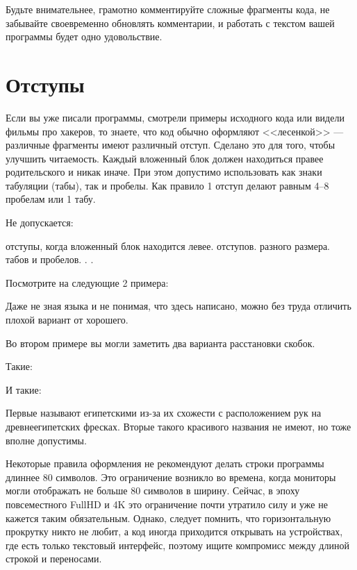 \documentclass[book.tex]{subfiles}
\begin{document}

Будьте внимательнее, грамотно комментируйте сложные фрагменты кода, не забывайте своевременно обновлять комментарии, и работать с текстом вашей программы будет одно удовольствие.

\section*{Отступы}

Если вы уже писали программы, смотрели примеры исходного кода или видели фильмы про хакеров, то знаете, что код обычно оформляют <<лесенкой>> --- различные фрагменты имеют различный отступ. Сделано это для того, чтобы улучшить читаемость. Каждый вложенный блок должен находиться правее родительского и никак иначе. При этом допустимо использовать как знаки табуляции (табы), так и пробелы. Как правило 1 отступ делают равным 4--8 пробелам или 1 табу.

Не допускается:
\begin{itemize}
 отступы, когда вложенный блок находится левее.
 отступов.
 разного размера.
 табов и пробелов.
.
.
\end{itemize}

Посмотрите на следующие 2 примера:



Даже не зная языка и не понимая, что здесь написано, можно без труда отличить плохой вариант от хорошего.

Во втором примере вы могли заметить два варианта расстановки скобок.

Такие:


И такие:


Первые называют египетскими из-за их схожести с расположением рук на древнеегипетских фресках. Вторые такого красивого названия не имеют, но тоже вполне допустимы.

Некоторые правила оформления не рекомендуют делать строки программы длиннее 80 символов. Это ограничение возникло во времена, когда мониторы могли отображать не больше 80 символов в ширину. Сейчас, в эпоху повсеместного FullHD и 4K это ограничение почти утратило силу и уже не кажется таким обязательным. Однако, следует помнить, что горизонтальную прокрутку никто не любит, а код иногда приходится открывать на устройствах, где есть только текстовый интерфейс, поэтому ищите компромисс между длиной строкой и переносами.
\end{document}
